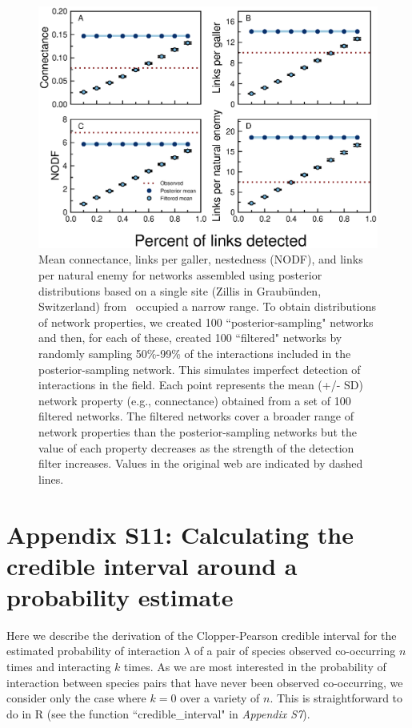 \documentclass[12pt]{article}
\begin{document}
  \begin{figure}[h!]
    \caption{Mean connectance, links per galler, nestedness (NODF), and links per natural enemy for networks assembled using posterior distributions based on a single site (Zillis in Graub\"{u}nden, Switzerland) from~\citet{Kopelke2017} occupied a narrow range. To obtain distributions of network properties, we created 100 ``posterior-sampling" networks and then, for each of these, created 100 ``filtered" networks by randomly sampling 50\%-99\% of the interactions included in the posterior-sampling network. This simulates imperfect detection of interactions in the field. Each point represents the mean (+/- SD) network property (e.g., connectance) obtained from a set of 100 filtered networks. The filtered networks cover a broader range of network properties than the posterior-sampling networks but the value of each property decreases as the strength of the detection filter increases. Values in the original web are indicated by dashed lines.}
    \label{posterior_webs}    
    \begin{center}
    \includegraphics[width=.8\textwidth]{figures/GP_posterior_properties_Zillis.eps}
    \end{center}
    \end{figure}



\clearpage
\newpage

\section*{Appendix S11: Calculating the credible interval around a probability estimate}

  Here we describe the derivation of the Clopper-Pearson credible interval for the estimated probability of interaction $\lambda$ of a pair of species observed co-occurring $n$ times and interacting $k$ times. As we are most interested in the probability of interaction between species pairs that have never been observed co-occurring, we consider only the case where $k=0$ over a variety of $n$. This is straightforward to do in R (see the function ``credible\_interval" in \emph{Appendix S7}). 
\end{document}
